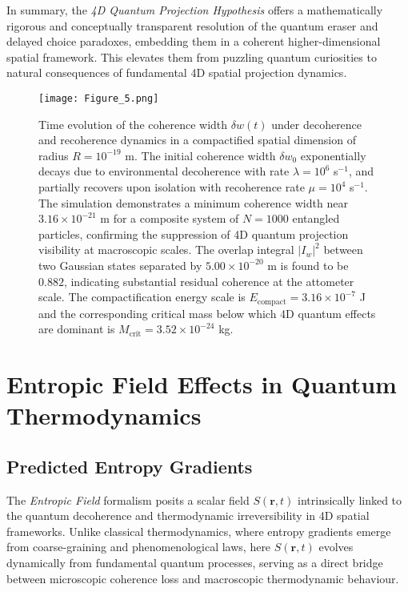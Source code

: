 \documentclass[12pt]{article}
\begin{document}
\bigskip
\noindent
In summary, the \emph{4D Quantum Projection Hypothesis} offers a mathematically rigorous and conceptually transparent resolution of the quantum eraser and delayed choice paradoxes, embedding them in a coherent higher-dimensional spatial framework. This elevates them from puzzling quantum curiosities to natural consequences of fundamental 4D spatial projection dynamics.

\begin{figure}[htbp]
    \centering
    \texttt{[image: Figure\_5.png]}
    \caption{
        Time evolution of the coherence width $\delta w(t)$ under decoherence and recoherence dynamics in a compactified spatial dimension of radius $R = 10^{-19}$ m. 
        The initial coherence width $\delta w_0$ exponentially decays due to environmental decoherence with rate $\lambda = 10^6$ s$^{-1}$, and partially recovers upon isolation with recoherence rate $\mu = 10^4$ s$^{-1}$.
        The simulation demonstrates a minimum coherence width near $3.16 \times 10^{-21}$ m for a composite system of $N = 1000$ entangled particles, confirming the suppression of 4D quantum projection visibility at macroscopic scales.
        The overlap integral $|I_w|^2$ between two Gaussian states separated by $5.00 \times 10^{-20}$ m is found to be $0.882$, indicating substantial residual coherence at the attometer scale.
        The compactification energy scale is $E_{\mathrm{compact}} = 3.16 \times 10^{-7}$ J and the corresponding critical mass below which 4D quantum effects are dominant is $M_{\mathrm{crit}} = 3.52 \times 10^{-24}$ kg.
    }
    \label{fig:coherence_dynamics}
\end{figure}

\section{Entropic Field Effects in Quantum Thermodynamics}

\subsection{Predicted Entropy Gradients}

The \emph{Entropic Field} formalism posits a scalar field \( S(\mathbf{r}, t) \) intrinsically linked to the quantum decoherence and thermodynamic irreversibility in 4D spatial frameworks. Unlike classical thermodynamics, where entropy gradients emerge from coarse-graining and phenomenological laws, here \( S(\mathbf{r}, t) \) evolves dynamically from fundamental quantum processes, serving as a direct bridge between microscopic coherence loss and macroscopic thermodynamic behaviour.
\end{document}

